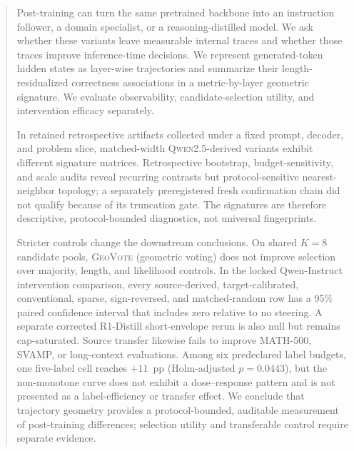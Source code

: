 \begin{abstract}
Post-training can turn the same pretrained backbone into an instruction
follower, a domain specialist, or a reasoning-distilled model. We ask whether
these variants leave measurable internal traces and whether those traces improve
inference-time decisions. We represent generated-token hidden states as
layer-wise trajectories and summarize their length-residualized correctness
associations in a metric-by-layer geometric signature. We evaluate observability,
candidate-selection utility, and intervention efficacy separately.

In retained retrospective artifacts collected under a fixed prompt, decoder,
and problem slice, matched-width \textsc{Qwen2.5}-derived variants exhibit
different signature matrices. Retrospective bootstrap, budget-sensitivity, and
scale audits reveal recurring contrasts but protocol-sensitive nearest-neighbor
topology; a separately preregistered fresh confirmation chain did not qualify
because of its truncation gate. The signatures are therefore descriptive,
protocol-bounded diagnostics, not universal fingerprints.

Stricter controls change the downstream conclusions. On shared $K{=}8$ candidate
pools, \textsc{GeoVote} (geometric voting) does not improve selection over
majority, length, and likelihood controls. In the locked Qwen-Instruct intervention comparison, every source-derived,
target-calibrated, conventional, sparse, sign-reversed, and matched-random row
has a 95\% paired confidence interval that includes zero relative to no steering. A
separate corrected R1-Distill short-envelope rerun is also null but remains
cap-saturated. Source transfer likewise fails to improve MATH-500, SVAMP, or
long-context evaluations. Among six predeclared label budgets, one
five-label cell reaches $+11$~pp (Holm-adjusted $p{=}0.0443$), but the non-monotone curve does not exhibit a dose--response pattern and is not
presented as a label-efficiency or transfer effect. We
conclude that trajectory geometry provides a protocol-bounded, auditable
measurement of post-training differences; selection utility and transferable
control require separate evidence.
\end{abstract}
